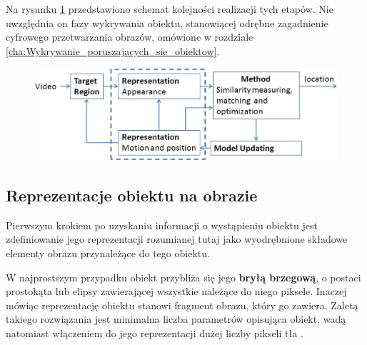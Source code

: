 Na rysunku \ref{fig:Ogolny_model_dzialania_algorytmow_sledzenia_obiektow} przedstawiono schemat kolejności realizacji tych etapów. Nie uwzględnia on fazy wykrywania obiektu, stanowiącej odrębne zagadnienie cyfrowego przetwarzania obrazów, omówione w rozdziale \ref{cha:Wykrywanie_poruszajacych_sie_obiektow}.

\begin{figure}[!htb]
	\begin{center}
		\includegraphics[width=12cm]{images/object_trackers_reference_model.png}
	\end{center}	
\label{fig:Ogolny_model_dzialania_algorytmow_sledzenia_obiektow}
\end{figure}

\subsection{Reprezentacje obiektu na obrazie}
\label{subsec:Reprezentacje_obiektu_na_obrazie}

Pierwszym krokiem po uzyskaniu informacji o wystąpieniu obiektu jest zdefiniowanie jego reprezentacji rozumianej tutaj jako wyodrębnione składowe elementy obrazu przynależące do tego obiektu.

W najprostszym przypadku obiekt przybliża się jego \textbf{bryłą brzegową}, o postaci prostokąta lub elipsy zawierającej wszystkie należące do niego piksele. Inaczej mówiąc reprezentację obiektu stanowi fragment obrazu, który go zawiera. Zaletą takiego rozwiązania jest minimalna liczba parametrów opisująca obiekt, wadą natomiast włączeniem do jego reprezentacji dużej liczby pikseli tła \cite{Smeulders2010}.

